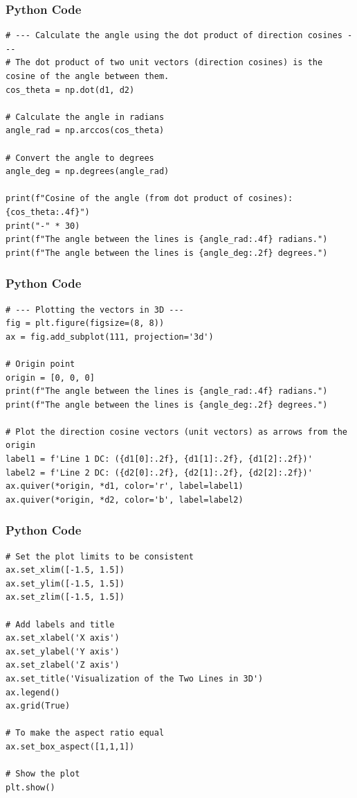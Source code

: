 \documentclass{beamer}
\begin{document}
\begin{frame}[fragile]
\frametitle{Python Code }
\begin{lstlisting}
# --- Calculate the angle using the dot product of direction cosines ---
# The dot product of two unit vectors (direction cosines) is the cosine of the angle between them.
cos_theta = np.dot(d1, d2)

# Calculate the angle in radians
angle_rad = np.arccos(cos_theta)

# Convert the angle to degrees
angle_deg = np.degrees(angle_rad)

print(f"Cosine of the angle (from dot product of cosines): {cos_theta:.4f}")
print("-" * 30)
print(f"The angle between the lines is {angle_rad:.4f} radians.")
print(f"The angle between the lines is {angle_deg:.2f} degrees.")

\end{lstlisting}
\end{frame}  
\begin{frame}[fragile]
\frametitle{Python Code }
\begin{lstlisting}
# --- Plotting the vectors in 3D ---
fig = plt.figure(figsize=(8, 8))
ax = fig.add_subplot(111, projection='3d')

# Origin point
origin = [0, 0, 0]
print(f"The angle between the lines is {angle_rad:.4f} radians.")
print(f"The angle between the lines is {angle_deg:.2f} degrees.")

# Plot the direction cosine vectors (unit vectors) as arrows from the origin
label1 = f'Line 1 DC: ({d1[0]:.2f}, {d1[1]:.2f}, {d1[2]:.2f})'
label2 = f'Line 2 DC: ({d2[0]:.2f}, {d2[1]:.2f}, {d2[2]:.2f})'
ax.quiver(*origin, *d1, color='r', label=label1)
ax.quiver(*origin, *d2, color='b', label=label2)

\end{lstlisting}
\end{frame}  
\begin{frame}[fragile]
\frametitle{Python Code }
\begin{lstlisting}
# Set the plot limits to be consistent
ax.set_xlim([-1.5, 1.5])
ax.set_ylim([-1.5, 1.5])
ax.set_zlim([-1.5, 1.5])

# Add labels and title
ax.set_xlabel('X axis')
ax.set_ylabel('Y axis')
ax.set_zlabel('Z axis')
ax.set_title('Visualization of the Two Lines in 3D')
ax.legend()
ax.grid(True)

# To make the aspect ratio equal
ax.set_box_aspect([1,1,1]) 

# Show the plot
plt.show()

\end{lstlisting}
\end{frame}  
\end{document}
